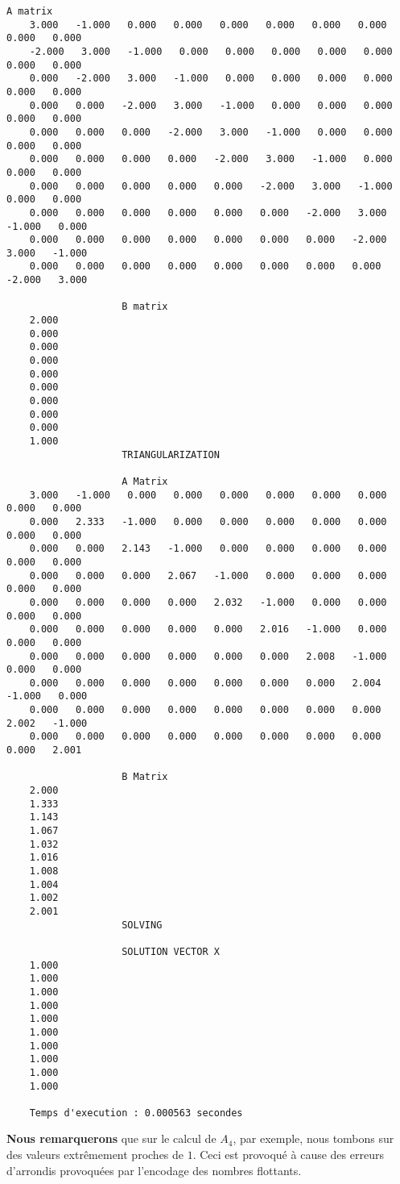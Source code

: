 \begin{lstlisting}[caption={$A_{12}=B$} results, basicstyle=\fontsize{5}{8}\selectfont]
					A matrix 
	3.000   -1.000   0.000   0.000   0.000   0.000   0.000   0.000   0.000   0.000   
	-2.000   3.000   -1.000   0.000   0.000   0.000   0.000   0.000   0.000   0.000   
	0.000   -2.000   3.000   -1.000   0.000   0.000   0.000   0.000   0.000   0.000   
	0.000   0.000   -2.000   3.000   -1.000   0.000   0.000   0.000   0.000   0.000   
	0.000   0.000   0.000   -2.000   3.000   -1.000   0.000   0.000   0.000   0.000   
	0.000   0.000   0.000   0.000   -2.000   3.000   -1.000   0.000   0.000   0.000   
	0.000   0.000   0.000   0.000   0.000   -2.000   3.000   -1.000   0.000   0.000   
	0.000   0.000   0.000   0.000   0.000   0.000   -2.000   3.000   -1.000   0.000   
	0.000   0.000   0.000   0.000   0.000   0.000   0.000   -2.000   3.000   -1.000   
	0.000   0.000   0.000   0.000   0.000   0.000   0.000   0.000   -2.000   3.000   
	
					B matrix 
	2.000   
	0.000   
	0.000   
	0.000   
	0.000   
	0.000   
	0.000   
	0.000   
	0.000   
	1.000   
					TRIANGULARIZATION 
	
					A Matrix 
	3.000   -1.000   0.000   0.000   0.000   0.000   0.000   0.000   0.000   0.000   
	0.000   2.333   -1.000   0.000   0.000   0.000   0.000   0.000   0.000   0.000   
	0.000   0.000   2.143   -1.000   0.000   0.000   0.000   0.000   0.000   0.000   
	0.000   0.000   0.000   2.067   -1.000   0.000   0.000   0.000   0.000   0.000   
	0.000   0.000   0.000   0.000   2.032   -1.000   0.000   0.000   0.000   0.000   
	0.000   0.000   0.000   0.000   0.000   2.016   -1.000   0.000   0.000   0.000   
	0.000   0.000   0.000   0.000   0.000   0.000   2.008   -1.000   0.000   0.000   
	0.000   0.000   0.000   0.000   0.000   0.000   0.000   2.004   -1.000   0.000   
	0.000   0.000   0.000   0.000   0.000   0.000   0.000   0.000   2.002   -1.000   
	0.000   0.000   0.000   0.000   0.000   0.000   0.000   0.000   0.000   2.001   
	
					B Matrix 
	2.000   
	1.333   
	1.143   
	1.067   
	1.032   
	1.016   
	1.008   
	1.004   
	1.002   
	2.001   
					SOLVING 
	
					SOLUTION VECTOR X 
	1.000   
	1.000   
	1.000   
	1.000   
	1.000   
	1.000   
	1.000   
	1.000   
	1.000   
	1.000   
	
	Temps d'execution : 0.000563 secondes
\end{lstlisting}

\textbf{Nous remarquerons} que sur le calcul de $A_4$, par exemple, nous tombons sur des valeurs extrêmement proches de $1$. Ceci est provoqué à cause des erreurs d'arrondis provoquées par l'encodage des nombres flottants.     